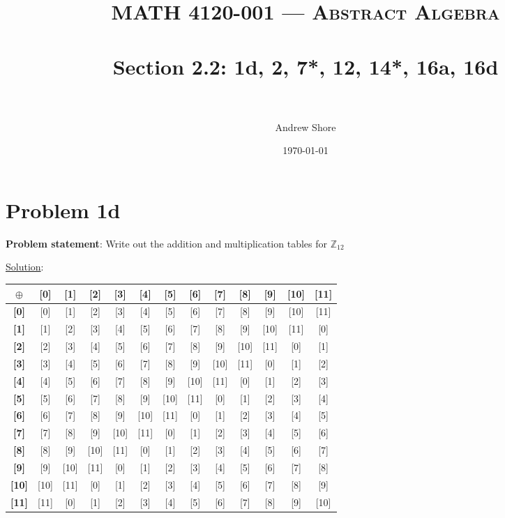 \documentclass{article} %
\title{ 
\normalfont \normalsize 
\textsc{MATH 4120-001 --- Abstract Algebra} \\
\horrule{0.5pt} \\[0cm] %
\huge Section 2.2: 1d, 2, 7*, 12, 14*, 16a, 16d \\ %
\horrule{2pt} \\[0cm] %
}
\author{Andrew Shore} %
\date{\normalsize\today} %
\begin{document}
\maketitle %

\section*{Problem 1d}


\textbf{Problem statement}: Write out the addition and multiplication tables for $\mathbb{Z}_{12}$

\underline{Solution}: 
\begin{addmargin}[1em]{0em}
\begin{tabular}{|c|c|c|c|c|c|c|c|c|c|c|c|c|}
\hline
\textbf{$\oplus$}&\textbf{[0]}&\textbf{[1]}&\textbf{[2]}&\textbf{[3]}&\textbf{[4]}&\textbf{[5]}&\textbf{[6]}&\textbf{[7]}&\textbf{[8]}&\textbf{[9]}&\textbf{[10]}&\textbf{[11]}\\ \hline
\textbf{[0]} & [0] & [1] & [2] & [3] & [4] & [5] & [6] & [7] & [8] & [9] & [10] & [11] \\ \hline
\textbf{[1]} & [1] & [2] & [3] & [4] & [5] & [6] & [7] & [8] & [9] & [10] & [11] & [0]\\ \hline
\textbf{[2]} & [2] & [3] & [4] & [5] & [6] & [7] & [8] & [9] & [10] & [11] & [0] & [1]\\ \hline
\textbf{[3]} & [3] & [4] & [5] & [6] & [7] & [8] & [9] & [10] & [11] & [0] & [1] & [2]\\ \hline
\textbf{[4]} & [4] & [5] & [6] & [7] & [8] & [9] & [10] & [11] & [0] & [1] & [2] & [3]\\ \hline
\textbf{[5]} & [5] & [6] & [7] & [8] & [9] & [10] & [11] & [0] & [1] & [2] & [3] & [4]\\ \hline
\textbf{[6]} & [6] & [7] & [8] & [9] & [10] & [11] & [0] & [1] & [2] & [3] & [4] & [5]\\ \hline
\textbf{[7]} & [7] & [8] & [9] & [10] & [11] & [0] & [1] & [2] & [3] & [4] & [5] & [6]\\ \hline
\textbf{[8]} & [8] & [9] & [10] & [11] & [0] & [1] & [2] & [3] & [4] & [5] & [6] & [7]\\ \hline
\textbf{[9]} & [9] & [10] & [11] & [0] & [1] & [2] & [3] & [4] & [5] & [6] & [7] & [8]\\ \hline
\textbf{[10]} & [10] & [11] & [0] & [1] & [2] & [3] & [4] & [5] & [6] & [7] & [8] & [9]\\ \hline
\textbf{[11]} & [11] & [0] & [1] & [2] & [3] & [4] & [5] & [6] & [7] & [8] & [9] & [10]\\ \hline


\end{tabular}
\end{addmargin}
\end{document}
